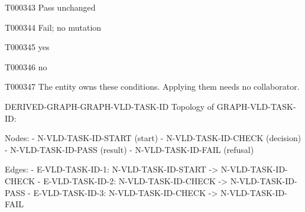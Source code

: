 \documentclass[11pt,a4paper]{article}
\begin{document}
\begin{atlastext}{T000343}
Pass unchanged
\end{atlastext}
\begin{atlastext}{T000344}
Fail; no mutation
\end{atlastext}
\begin{atlastext}{T000345}
yes
\end{atlastext}
\begin{atlastext}{T000346}
no
\end{atlastext}
\begin{atlasparagraph}{T000347}
The entity owns these conditions. Applying them needs no collaborator.
\end{atlasparagraph}
\par\noindent\begin{minipage}{\linewidth}
\begin{atlasderived}{DERIVED-GRAPH-GRAPH-VLD-TASK-ID}
Topology of GRAPH-VLD-TASK-ID:

Nodes:
- N-VLD-TASK-ID-START (start)
- N-VLD-TASK-ID-CHECK (decision)
- N-VLD-TASK-ID-PASS (result)
- N-VLD-TASK-ID-FAIL (refusal)

Edges:
- E-VLD-TASK-ID-1: N-VLD-TASK-ID-START -> N-VLD-TASK-ID-CHECK
- E-VLD-TASK-ID-2: N-VLD-TASK-ID-CHECK -> N-VLD-TASK-ID-PASS
- E-VLD-TASK-ID-3: N-VLD-TASK-ID-CHECK -> N-VLD-TASK-ID-FAIL
\end{atlasderived}
\end{minipage}\par
\end{document}
